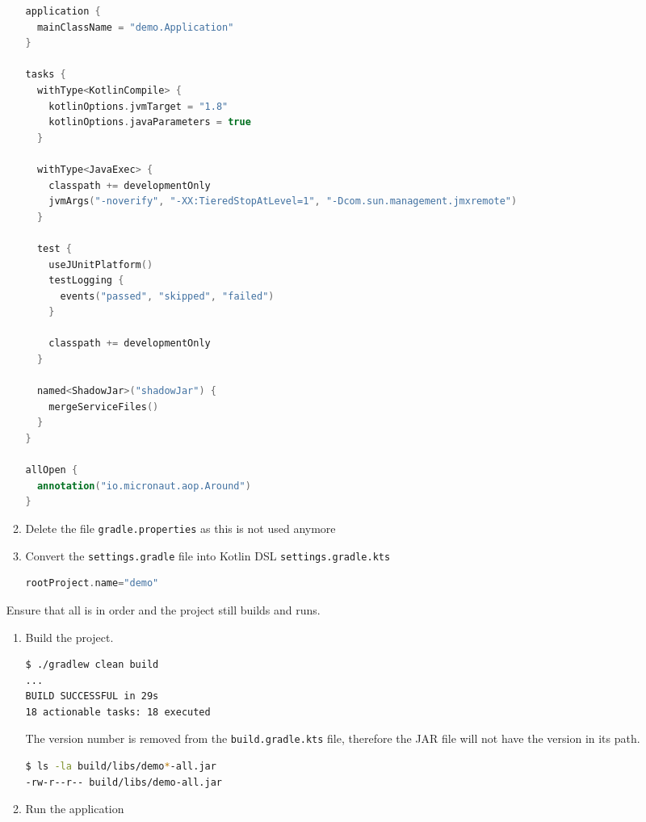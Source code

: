 \begin{enumerate}
\begin{enumerate}
\begin{lstlisting}[language=Kotlin]
application {
  mainClassName = "demo.Application"
}

tasks {
  withType<KotlinCompile> {
    kotlinOptions.jvmTarget = "1.8"
    kotlinOptions.javaParameters = true
  }

  withType<JavaExec> {
    classpath += developmentOnly
    jvmArgs("-noverify", "-XX:TieredStopAtLevel=1", "-Dcom.sun.management.jmxremote")
  }

  test {
    useJUnitPlatform()
    testLogging {
      events("passed", "skipped", "failed")
    }

    classpath += developmentOnly
  }

  named<ShadowJar>("shadowJar") {
    mergeServiceFiles()
  }
}

allOpen {
  annotation("io.micronaut.aop.Around")
}
\end{lstlisting}

\item Delete the file \texttt{gradle.properties} as this is not used anymore

\item Convert the \texttt{settings.gradle} file into Kotlin DSL \texttt{settings.gradle.kts}

\begin{lstlisting}[language=Kotlin]
rootProject.name="demo"
\end{lstlisting}

\end{enumerate}

Ensure that all is in order and the project still builds and runs.

\begin{enumerate}

\item Build the project.

\begin{lstlisting}[language=bash]
$ ./gradlew clean build
...
BUILD SUCCESSFUL in 29s
18 actionable tasks: 18 executed
\end{lstlisting}

The version number is removed from the \texttt{build.gradle.kts} file, therefore the JAR file will not have the version in its path.

\begin{lstlisting}[language=bash]
$ ls -la build/libs/demo*-all.jar
-rw-r--r-- build/libs/demo-all.jar
\end{lstlisting}

\item Run the application


\end{enumerate}
\end{enumerate}
